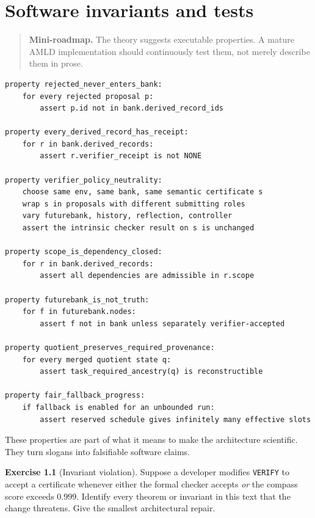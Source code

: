 \documentclass[11pt,openany]{book}
\theoremstyle{definition}
\newtheorem{exercise}[theorem]{Exercise}
\theoremstyle{remark}
\newenvironment{miniroadmap}{\begin{quote}\small\color{deepblue}\textbf{Mini-roadmap.} }{\end{quote}}
\begin{document}
\chapter{Software invariants and tests}
\begin{miniroadmap}
The theory suggests executable properties. A mature AMLD implementation should continuously test them, not merely describe them in prose.
\end{miniroadmap}

\begin{lstlisting}[style=pseudo,caption={Core invariant tests}]
property rejected_never_enters_bank:
    for every rejected proposal p:
        assert p.id not in bank.derived_record_ids

property every_derived_record_has_receipt:
    for r in bank.derived_records:
        assert r.verifier_receipt is not NONE

property verifier_policy_neutrality:
    choose same env, same bank, same semantic certificate s
    wrap s in proposals with different submitting roles
    vary futurebank, history, reflection, controller
    assert the intrinsic checker result on s is unchanged

property scope_is_dependency_closed:
    for r in bank.derived_records:
        assert all dependencies are admissible in r.scope

property futurebank_is_not_truth:
    for f in futurebank.nodes:
        assert f not in bank unless separately verifier-accepted

property quotient_preserves_required_provenance:
    for every merged quotient state q:
        assert task_required_ancestry(q) is reconstructible

property fair_fallback_progress:
    if fallback is enabled for an unbounded run:
        assert reserved schedule gives infinitely many effective slots
\end{lstlisting}

These properties are part of what it means to make the architecture scientific. They turn slogans into falsifiable software claims.

\begin{exercise}[Invariant violation]\label{ex:invariant}
Suppose a developer modifies \texttt{VERIFY} to accept a certificate whenever either the formal checker accepts \emph{or} the compass score exceeds $0.999$. Identify every theorem or invariant in this text that the change threatens. Give the smallest architectural repair.
\end{exercise}
\end{document}
